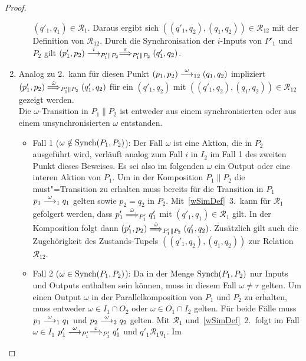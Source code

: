 \begin{proof}
\begin{enumerate}
\begin{itemize}
          $(q'_1,q_1)\in\mathcal{R}_1$. Daraus ergibt sich
          $((q'_1,q_2),(q_1,q_2)) \in \mathcal{R}_{12}$ mit der Definition von
          $\mathcal{R}_{12}$. Durch die Synchronisation der $i$-Inputs von
          $P'_1$ und $P_2$ gilt $(p'_1,p_2) \must[i]_{P'_1\|P_2}
          \weakmust[\varepsilon]_{P'_1\|P_2} (q'_1,q_2)$.
      \end{itemize}
    \item Analog zu 2.\ kann für diesen Punkt $(p_1,p_2) \must[\omega]_{12}
      (q_1,q_2)$ impliziert $(p'_1,p_2) \weakmust[\hat{\omega}]_{P'_1\|P_2}
      (q'_1,q_2)$ für ein $(q'_1,q_2)$ mit $((q'_1,q_2),(q_1,q_2)) \in
      \mathcal{R}_{12}$ gezeigt werden.\\
      Die $\omega$-Transition in $P_1\|P_2$ ist entweder aus einem
      synchronisierten oder aus einem unsynchronisierten $\omega$ entstanden.
      \begin{itemize}
        \item Fall 1 ($\omega\notin\mathrm{Synch} (P_1,P_2)$): Der Fall $\omega$ ist
          eine Aktion, die in $P_2$ ausgeführt wird, verläuft analog zum Fall
          $i$ in $I_2$ im Fall 1 des zweiten Punkt dieses Beweises. Es sei also
          im folgenden $\omega$ ein Output oder eine interen Aktion von $P_1$.
          Um in der Komposition $P_1\|P_2$ die must"=Transition zu erhalten
          muss bereits für die Transition in $P_1$ $p_1 \must[\omega]_1 q_1$
          gelten sowie $p_2 = q_2$ in $P_2$. Mit~\ref{wSimDef}~3.\ kann für
          $\mathcal{R}_1$ gefolgert werden, dass $p'_1
          \weakmust[\hat{\omega}]_{P'_1} q'_1$ mit $(q'_1,q_1)\in\mathcal{R}_1$
          gilt. In der Komposition folgt dann $(p'_1,p_2)
          \weakmust[\hat{\omega}]_{P'_1\|P_2} (q'_1,q_2)$. Zusätzlich gilt auch
          die Zugehörigkeit des Zustands-Tupels $((q'_1,q_2),(q_1,q_2))$ zur
          Relation $\mathcal{R}_{12}$.
        \item Fall 2 ($\omega\in\mathrm{Synch} (P_1,P_2)$): Da in der Menge $\mathrm{Synch}
          (P_1,P_2)$ nur Inputs und Outputs enthalten sein können, muss in
          diesem Fall $\omega\neq\tau$ gelten. Um einen Output $\omega$ in der
          Parallelkomposition von $P_1$ und $P_2$ zu erhalten, muss entweder
          $\omega\in I_1\cap O_2$ oder $\omega\in O_1\cap I_2$ gelten. Für
          beide Fälle muss $p_1\must[\omega]_1 q_1$ und $p_2\must[\omega]_2
          q_2$ gelten. Mit $\mathcal{R}_1$ und~\ref{wSimDef}~2.\ folgt im Fall
          $\omega\in I_1$ $p'_1\must[\omega]_{P'_1}
          \weakmust[\varepsilon]_{P'_1} q'_1$ und $q'_1\mathcal{R}_1 q_1$. Im

\end{itemize}
\end{enumerate}
\end{proof}

